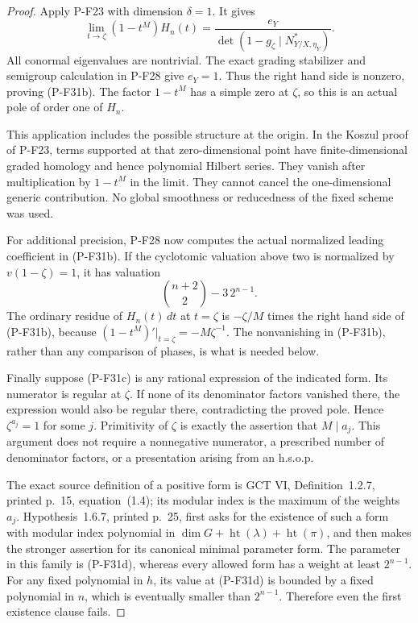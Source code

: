 \documentclass[11pt,a4paper]{article}
\begin{document}
\begin{proof}
Apply P-F23 with dimension $\delta=1$. It gives
\[
 \lim_{t\to\zeta}(1-t^M)H_n(t)
   =\frac{e_Y}{\det(1-g_\zeta\mid N^*_{Y/X,\eta_Y})}.
 \tag{P-F31f}
\]
All conormal eigenvalues are nontrivial. The exact grading
stabilizer and semigroup calculation in P-F28 give $e_Y=1$.
Thus the right hand side is nonzero, proving (P-F31b).
The factor $1-t^M$ has a simple zero at $\zeta$, so this is
an actual pole of order one of $H_n$.

This application includes the possible structure at the
origin. In the Koszul proof of P-F23, terms supported at
that zero-dimensional point have finite-dimensional graded
homology and hence polynomial Hilbert series. They vanish
after multiplication by $1-t^M$ in the limit. They cannot
cancel the one-dimensional generic contribution. No global
smoothness or reducedness of the fixed scheme was used.

For additional precision, P-F28 now computes the actual
normalized leading coefficient in (P-F31b). If the cyclotomic
valuation above two is normalized by $v(1-\zeta)=1$, it has
valuation
\[
 \binom{n+2}{2}-3\,2^{n-1}.
 \tag{P-F31g}
\]
The ordinary residue of $H_n(t)\,dt$ at $t=\zeta$ is
$-\zeta/M$ times the right hand side of (P-F31b), because
$(1-t^M)'|_{t=\zeta}=-M\zeta^{-1}$. The nonvanishing
in (P-F31b), rather than any comparison of phases, is
what is needed below.

Finally suppose (P-F31c) is any rational expression of
the indicated form. Its numerator is regular at $\zeta$.
If none of its denominator factors vanished there, the
expression would also be regular there, contradicting
the proved pole. Hence $\zeta^{a_j}=1$ for some $j$.
Primitivity of $\zeta$ is exactly the assertion that
$M\mid a_j$. This argument does not require a nonnegative
numerator, a prescribed number of denominator factors,
or a presentation arising from an h.s.o.p.

The exact source definition of a positive form is
GCT VI, Definition~1.2.7, printed p.~15, equation~(1.4);
its modular index is the maximum of the weights $a_j$.
Hypothesis~1.6.7, printed p.~25, first asks for the
existence of such a form with modular index polynomial
in $\dim G+\operatorname{ht}(\lambda)+\operatorname{ht}(\pi)$,
and then makes the stronger assertion for its canonical
minimal parameter form. The parameter in this family is
(P-F31d), whereas every allowed form has a weight at
least $2^{n-1}$. For any fixed polynomial in $h$, its
value at (P-F31d) is bounded by a fixed polynomial in
$n$, which is eventually smaller than $2^{n-1}$.
Therefore even the first existence clause fails.
\end{proof}
\end{document}
